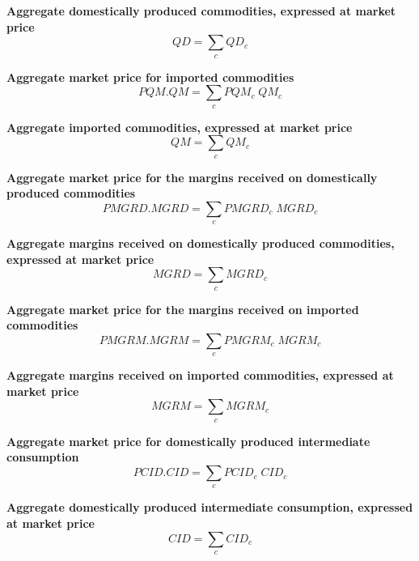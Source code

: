 \documentclass[12pt]{article}
\numberwithin{equation}{section}
\begin{document}
\noindent\textbf{Aggregate domestically produced commodities, expressed at market price} \\
\begin{dmath}
QD = \sum_{c} QD_{c}
\end{dmath}

\noindent\textbf{Aggregate market price for imported commodities} \\
\begin{dmath}
PQM . QM = \sum_{c} PQM_{c} \; QM_{c}
\end{dmath}

\noindent\textbf{Aggregate imported commodities, expressed at market price} \\
\begin{dmath}
QM = \sum_{c} QM_{c}
\end{dmath}

\noindent\textbf{Aggregate market price for the margins received on domestically produced commodities} \\
\begin{dmath}
PMGRD . MGRD = \sum_{c} PMGRD_{c} \; MGRD_{c}
\end{dmath}

\noindent\textbf{Aggregate margins received on domestically produced commodities, expressed at market price} \\
\begin{dmath}
MGRD = \sum_{c} MGRD_{c}
\end{dmath}

\noindent\textbf{Aggregate market price for the margins received on imported commodities} \\
\begin{dmath}
PMGRM . MGRM = \sum_{c} PMGRM_{c} \; MGRM_{c}
\end{dmath}

\noindent\textbf{Aggregate margins received on imported commodities, expressed at market price} \\
\begin{dmath}
MGRM = \sum_{c} MGRM_{c}
\end{dmath}

\noindent\textbf{Aggregate market price for domestically produced intermediate consumption} \\
\begin{dmath}
PCID . CID = \sum_{c} PCID_{c} \; CID_{c}
\end{dmath}

\noindent\textbf{Aggregate domestically produced intermediate consumption, expressed at market price} \\
\begin{dmath}
CID = \sum_{c} CID_{c}
\end{dmath}
\end{document}
